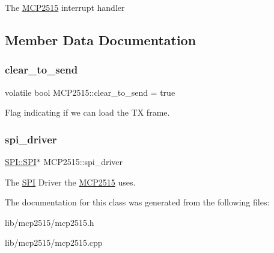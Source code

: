 The \hyperlink{class_m_c_p2515}{M\+C\+P2515} interrupt handler 

\subsection{Member Data Documentation}
\hypertarget{class_m_c_p2515_a1418f0f66d9a57659809192552d5ac37}{}\label{class_m_c_p2515_a1418f0f66d9a57659809192552d5ac37} 
\subsubsection{\texorpdfstring{clear\+\_\+to\+\_\+send}{clear\_to\_send}}
{\footnotesize\ttfamily volatile bool M\+C\+P2515\+::clear\+\_\+to\+\_\+send = true\hspace{0.3cm}{\ttfamily [private]}}

Flag indicating if we can load the TX frame. \hypertarget{class_m_c_p2515_a7c70cb397f4d2881a1878e40b9278ad0}{}\label{class_m_c_p2515_a7c70cb397f4d2881a1878e40b9278ad0} 
\subsubsection{\texorpdfstring{spi\+\_\+driver}{spi\_driver}}
{\footnotesize\ttfamily \hyperlink{class_s_p_i_1_1_s_p_i}{S\+P\+I\+::\+S\+PI}$\ast$ M\+C\+P2515\+::spi\+\_\+driver\hspace{0.3cm}{\ttfamily [private]}}

The \hyperlink{namespace_s_p_i}{S\+PI} Driver the \hyperlink{class_m_c_p2515}{M\+C\+P2515} uses. 

The documentation for this class was generated from the following files\+:\begin{DoxyCompactItemize}
\item 
lib/mcp2515/mcp2515.\+h\item 
lib/mcp2515/mcp2515.\+cpp\end{DoxyCompactItemize}
